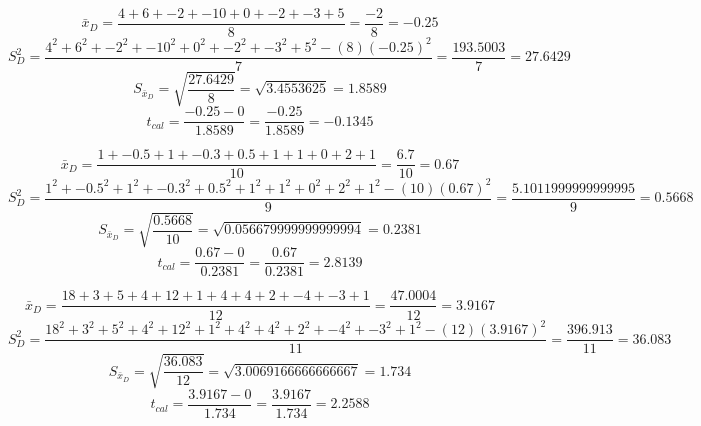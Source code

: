 $$\bar{x}_{D} = \frac{4+6+-2+-10+0+-2+-3+5}{8}=\frac{-2}{8}=-0.25$$
$$S^{2}_{D}=\frac{4^{2}+6^{2}+-2^{2}+-10^{2}+0^{2}+-2^{2}+-3^{2}+5^{2}-(8)(-0.25)^{2}}{7}=\frac{193.5003}{7}=27.6429$$
$$S_{\bar{x}_{D}} = \sqrt{\frac{27.6429}{8}}=\sqrt{3.4553625}=1.8589$$
$$t_{cal} = \frac{-0.25 - 0}{1.8589}=\frac{-0.25}{1.8589}=-0.1345$$

$$\bar{x}_{D} = \frac{1+-0.5+1+-0.3+0.5+1+1+0+2+1}{10}=\frac{6.7}{10}=0.67$$
$$S^{2}_{D}=\frac{1^{2}+-0.5^{2}+1^{2}+-0.3^{2}+0.5^{2}+1^{2}+1^{2}+0^{2}+2^{2}+1^{2}-(10)(0.67)^{2}}{9}=\frac{5.1011999999999995}{9}=0.5668$$
$$S_{\bar{x}_{D}} = \sqrt{\frac{0.5668}{10}}=\sqrt{0.056679999999999994}=0.2381$$
$$t_{cal} = \frac{0.67 - 0}{0.2381}=\frac{0.67}{0.2381}=2.8139$$

$$\bar{x}_{D} = \frac{18+3+5+4+12+1+4+4+2+-4+-3+1}{12}=\frac{47.0004}{12}=3.9167$$
$$S^{2}_{D}=\frac{18^{2}+3^{2}+5^{2}+4^{2}+12^{2}+1^{2}+4^{2}+4^{2}+2^{2}+-4^{2}+-3^{2}+1^{2}-(12)(3.9167)^{2}}{11}=\frac{396.913}{11}=36.083$$
$$S_{\bar{x}_{D}} = \sqrt{\frac{36.083}{12}}=\sqrt{3.0069166666666667}=1.734$$
$$t_{cal} = \frac{3.9167 - 0}{1.734}=\frac{3.9167}{1.734}=2.2588$$